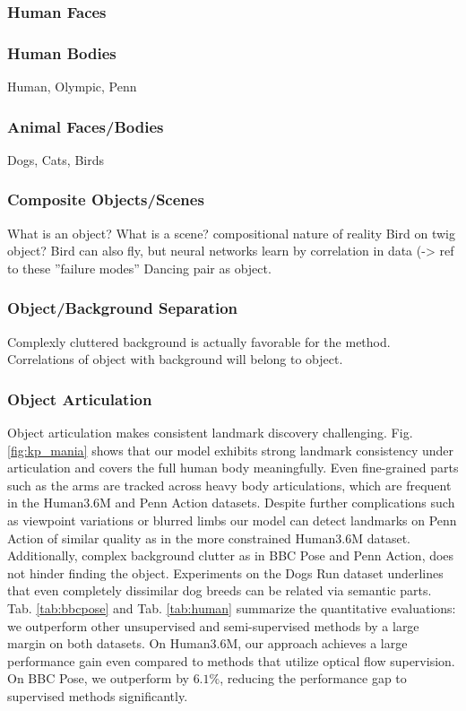 		\subsubsection{Human Faces}
		\subsubsection{Human Bodies}
		Human, Olympic, Penn
		\subsubsection{Animal Faces/Bodies}
		Dogs, Cats, Birds
		\subsubsection{Composite Objects/Scenes}
		What is an object? What is a scene?
		compositional nature of reality
		Bird on twig object? Bird can also fly, but neural networks learn by correlation in data (-> ref to these ''failure modes''
		Dancing pair as object.
		\subsubsection{Object/Background Separation}
			Complexly cluttered background is actually favorable for the method. Correlations of object with background will belong to object.
		\subsubsection{Object Articulation}
			Object articulation makes consistent landmark discovery challenging.
			Fig. \ref{fig:kp_mania} shows that our model exhibits strong landmark consistency under articulation and covers the full human body meaningfully.
			Even fine-grained parts such as the arms are tracked across heavy body articulations, which are frequent in the Human3.6M and Penn Action datasets.
			Despite further complications such as viewpoint variations or blurred limbs our model can detect landmarks on Penn Action of similar quality as in the more constrained Human3.6M dataset.
			Additionally, complex background clutter as in BBC Pose and Penn Action, does not hinder finding the object.
			Experiments on the Dogs Run dataset underlines that even completely dissimilar dog breeds can be related via semantic parts.
			Tab. \ref{tab:bbcpose} and Tab. \ref{tab:human} summarize the quantitative evaluations: we outperform other unsupervised and semi-supervised methods by a large margin on both datasets.
			On Human3.6M, our approach achieves a large performance gain even compared to methods that utilize optical flow supervision.
			On BBC Pose, we outperform \cite{Jakab:2018wc} by $6.1\%$, reducing the performance gap to supervised methods significantly.
